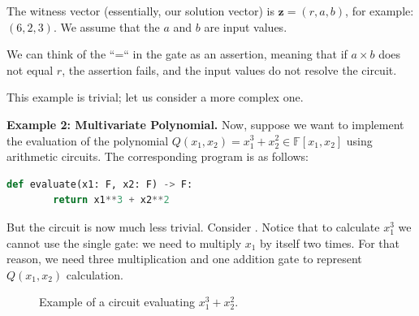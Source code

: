 \documentclass[../../book.tex]{subfiles}
\begin{document}
The witness vector (essentially, our solution vector) is $\mathbf{z} = (r, a, b)$, for example: $(6, 2, 3)$. We 
assume that the $a$ and $b$ are input values. 

We can think of the ``=`` in the gate as an assertion, meaning that if $a \times b$ does not equal
$r$, the assertion fails, and the input values do not resolve the circuit.

This example is trivial; let us consider a more complex one.

\textbf{Example 2: Multivariate Polynomial.} Now, suppose we want to implement the evaluation of the polynomial $Q(x_1,x_2) = x_1^3 + x_2^2 \in \mathbb{F}[x_1,x_2]$ using arithmetic circuits. The corresponding program is as follows:
\begin{lstlisting}[language=Python,numbers=none]
    def evaluate(x1: F, x2: F) -> F:
        return x1**3 + x2**2
\end{lstlisting}

But the circuit is now much less trivial. Consider . Notice that to calculate $x_1^3$ we cannot use the single gate: we need to multiply $x_1$ by itself two times. For that reason, we need three multiplication and one addition gate to represent $Q(x_1,x_2)$ calculation.
\begin{figure}[h!]
    \centering
    \caption{Example of a circuit evaluating $x_1^3 + x_2^2$.}
    \label{fig:multivariate-polynomial-circuit}
\end{figure}
\end{document}
